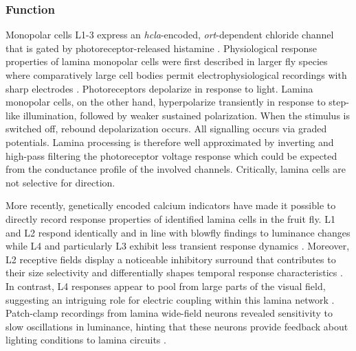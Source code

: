 \subsubsection{Function}
Monopolar cells L1-3 express an \textit{hcla}-encoded, \textit{ort}-dependent chloride channel that is gated by photoreceptor-released histamine \citep{Hardie:1989aa,Gengs:2002aa}. Physiological response properties of lamina monopolar cells were first described in larger fly species where comparatively large cell bodies permit electrophysiological recordings with sharp electrodes \citep{Laughlin:1978aa,Laughlin:1981wn,Laughlin:1989aa}. Photoreceptors depolarize in response to light. Lamina monopolar cells, on the other hand, hyperpolarize transiently in response to step-like illumination, followed by weaker sustained polarization. When the stimulus is switched off, rebound depolarization occurs. All signalling occurs via graded potentials. Lamina processing is therefore well approximated by inverting and high-pass filtering the photoreceptor voltage response which could be expected from the conductance profile of the involved channels. Critically, lamina cells are not selective for direction.

More recently, genetically encoded calcium indicators have made it possible to directly record response properties of identified lamina cells in the fruit fly. L1 and L2 respond identically and in line with blowfly findings to luminance changes \citep{Reiff:2010eo,Clark:2011gw} while L4 and particularly L3 exhibit less transient response dynamics \citep{Silies:2013jp,Meier:2014fr}. Moreover, L2 receptive fields display a noticeable inhibitory surround that contributes to their size selectivity and differentially shapes temporal response characteristics \citep{Freifeld:2013gu}. In contrast, L4 responses appear to pool from large parts of the visual field, suggesting an intriguing role for electric coupling within this lamina network \citep{Meier:2014fr}. Patch-clamp recordings from lamina wide-field neurons revealed sensitivity to slow oscillations in luminance, hinting that these neurons provide feedback about lighting conditions to lamina circuits \citep{Tuthill:2014gc}.

